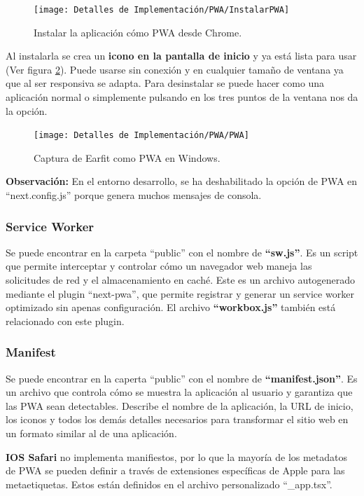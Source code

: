 \documentclass[12pt,twoside,titlepage]{report}
\begin{document}
\begin{figure}[H]
    \centering
    \texttt{[image: Detalles de Implementación/PWA/InstalarPWA]}
    \caption{Instalar la aplicación cómo PWA desde Chrome.}
    \label{fig:InstalarPWA}
\end{figure}

Al instalarla se crea un \textbf{icono en la pantalla de inicio} y ya está lista para usar (Ver figura \ref{fig:PWA}). Puede usarse sin conexión y en cualquier tamaño de ventana ya que al ser responsiva se adapta. Para desinstalar se puede hacer como una aplicación normal o simplemente pulsando en los tres puntos de la ventana nos da la opción.

\begin{figure}[H]
    \centering
    \texttt{[image: Detalles de Implementación/PWA/PWA]}
    \caption{Captura de Earfit como PWA en Windows.}
    \label{fig:PWA}
\end{figure}

\textbf{Observación:} En el entorno desarrollo, se ha deshabilitado la opción de PWA en ``next.config.js'' porque genera muchos mensajes de consola.

\subsubsection{Service Worker}
Se puede encontrar en la carpeta ``public'' con el nombre de \textbf{``sw.js''}. Es un script que permite interceptar y controlar cómo un navegador web maneja las solicitudes de red y el almacenamiento en caché. Este es un archivo autogenerado mediante el plugin ``next-pwa'', que permite registrar y generar un service worker optimizado sin apenas configuración. El archivo \textbf{``workbox.js''} también está relacionado con este plugin.

\subsubsection{Manifest}
Se puede encontrar en la caperta ``public'' con el nombre de \textbf{``manifest.json''}. Es un archivo que controla cómo se muestra la aplicación al usuario y garantiza que las PWA sean detectables. Describe el nombre de la aplicación, la URL de inicio, los iconos y todos los demás detalles necesarios para transformar el sitio web en un formato similar al de una aplicación. 

\textbf{IOS Safari} no implementa manifiestos, por lo que la mayoría de los metadatos de PWA se pueden definir a través de extensiones específicas de Apple para las metaetiquetas. Estos están definidos en el archivo personalizado ``\_app.tsx''.
\end{document}
